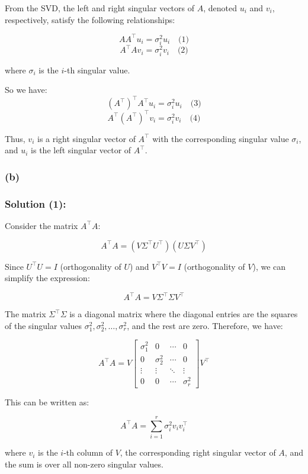 \documentclass[12pt]{article}
\begin{document}
From the SVD, the left and right singular vectors of \( A \), denoted \( u_i \) and \( v_i \), respectively, satisfy the following relationships:

\[
A A^\top u_i = \sigma_i^2 u_i \quad \text{(1)}
\]
\[
A^\top A v_i = \sigma_i^2 v_i \quad \text{(2)}
\]

where \( \sigma_i \) is the \( i \)-th singular value.

So we have:
\[
(A^\top)^\top A^\top u_i = \sigma_i^2 u_i \quad \text{(3)}
\]
\[
A^\top (A^\top)^\top v_i = \sigma_i^2 v_i \quad \text{(4)}
\]

Thus, \( v_i \) is a right singular vector of \( A^\top \) with the corresponding singular value \( \sigma_i \), and \( u_i \) is the left singular vector of \( A^\top \).

\subsubsection*{(b)}

\subsubsection*{Solution (1):}

Consider the matrix \( A^\top A \):

\[
A^\top A = (V \Sigma^\top U^\top) (U \Sigma V^\top)
\]

Since \( U^\top U = I \) (orthogonality of \( U \)) and \( V^\top V = I \) (orthogonality of \( V \)), we can simplify the expression:

\[
A^\top A = V \Sigma^\top \Sigma V^\top
\]

The matrix \( \Sigma^\top \Sigma \) is a diagonal matrix where the diagonal entries are the squares of the singular values \( \sigma_1^2, \sigma_2^2, \dots, \sigma_r^2 \), and the rest are zero. Therefore, we have:

\[
A^\top A = V \begin{bmatrix} \sigma_1^2 & 0 & \cdots & 0 \\
0 & \sigma_2^2 & \cdots & 0 \\
\vdots & \vdots & \ddots & \vdots \\
0 & 0 & \cdots & \sigma_r^2 \end{bmatrix} V^\top
\]

This can be written as:

\[
A^\top A = \sum_{i=1}^r \sigma_i^2 v_i v_i^\top
\]

where \( v_i \) is the \( i \)-th column of \( V \), the corresponding right singular vector of \( A \), and the sum is over all non-zero singular values.
\end{document}
